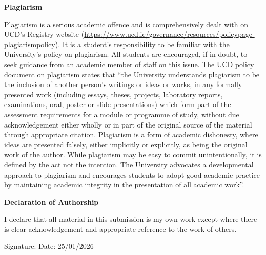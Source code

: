 \documentclass[12pt,a4paper]{report}
\begin{document}
\textbf{Plagiarism}

Plagiarism is a serious academic offence and is comprehensively dealt with on UCD’s Registry website (\href{https://www.ucd.ie/governance/resources/policypage-plagiarismpolicy}{https://www.ucd.ie/governance/resources/policypage-plagiarismpolicy}). It is a student’s responsibility to be familiar with the University’s policy on plagiarism. All students are encouraged, if in doubt, to seek guidance from an academic member of staff on this issue. The UCD policy document on plagiarism states that “the University understands plagiarism to be the inclusion of another person’s writings or ideas or works, in any formally presented work (including essays, theses, projects, laboratory reports, examinations, oral, poster or slide presentations) which form part of the assessment requirements for a module or programme of study, without due acknowledgement either wholly or in part of the original source of the material through appropriate citation. Plagiarism is a form of academic dishonesty, where ideas are presented falsely, either implicitly or explicitly, as being the original work of the author. While plagiarism may be easy to commit unintentionally, it is defined by the act not the intention. The University advocates a developmental approach to plagiarism and encourages students to adopt good academic practice by maintaining academic integrity in the presentation of all academic work”.

\textbf{Declaration of Authorship}

I declare that all material in this submission is my own work except where there is clear acknowledgement and appropriate reference to the work of others.


\vspace{2cm}
\noindent Signature: \hfill Date: 25/01/2026

\newpage

\tableofcontents
\listoffigures
\listoftables

\newpage
\end{document}
